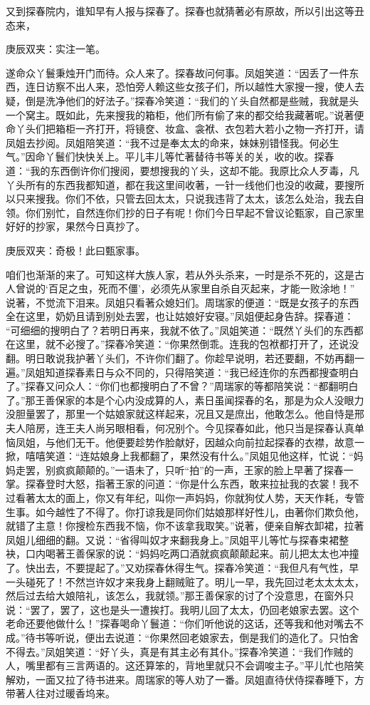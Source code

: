 \begin{parag}
    又到探春院内，谁知早有人报与探春了。探春也就猜著必有原故，所以引出这等丑态来，\begin{note}庚辰双夹：实注一笔。\end{note}遂命众丫鬟秉烛开门而待。众人来了。探春故问何事。凤姐笑道：“因丢了一件东西，连日访察不出人来，恐怕旁人赖这些女孩子们，所以越性大家搜一搜，使人去疑，倒是洗净他们的好法子。”探春冷笑道：“我们的丫头自然都是些贼，我就是头一个窝主。既如此，先来搜我的箱柜，他们所有偷了来的都交给我藏著呢。”说著便命丫头们把箱柜一齐打开，将镜奁、妆盒、衾袱、衣包若大若小之物一齐打开，请凤姐去抄阅。凤姐陪笑道：“我不过是奉太太的命来，妹妹别错怪我。何必生气。”因命丫鬟们快快关上。平儿丰儿等忙著替待书等关的关，收的收。探春道：“我的东西倒许你们搜阅，要想搜我的丫头，这却不能。我原比众人歹毒，凡丫头所有的东西我都知道，都在我这里间收著，一针一线他们也没的收藏，要搜所以只来搜我。你们不依，只管去回太太，只说我违背了太太，该怎么处治，我去自领。你们别忙，自然连你们抄的日子有呢！你们今日早起不曾议论甄家，自己家里好好的抄家，果然今日真抄了。\begin{note}庚辰双夹：奇极！此曰甄家事。\end{note}咱们也渐渐的来了。可知这样大族人家，若从外头杀来，一时是杀不死的，这是古人曾说的‘百足之虫，死而不僵’，必须先从家里自杀自灭起来，才能一败涂地！” 说著，不觉流下泪来。凤姐只看著众媳妇们。周瑞家的便道：“既是女孩子的东西全在这里，奶奶且请到别处去罢，也让姑娘好安寝。”凤姐便起身告辞。探春道： “可细细的搜明白了？若明日再来，我就不依了。”凤姐笑道：“既然丫头们的东西都在这里，就不必搜了。”探春冷笑道：“你果然倒乖。连我的包袱都打开了，还说没翻。明日敢说我护著丫头们，不许你们翻了。你趁早说明，若还要翻，不妨再翻一遍。”凤姐知道探春素日与众不同的，只得陪笑道：“我已经连你的东西都搜查明白了。”探春又问众人：“你们也都搜明白了不曾？”周瑞家的等都陪笑说：“都翻明白了。”那王善保家的本是个心内没成算的人，素日虽闻探春的名，那是为众人没眼力没胆量罢了，那里一个姑娘家就这样起来，况且又是庶出，他敢怎么。他自恃是邢夫人陪房，连王夫人尚另眼相看，何况别个。今见探春如此，他只当是探春认真单恼凤姐，与他们无干。他便要趁势作脸献好，因越众向前拉起探春的衣襟，故意一掀，嘻嘻笑道：“连姑娘身上我都翻了，果然没有什么。”凤姐见他这样，忙说：“妈妈走罢，别疯疯颠颠的。”一语未了，只听“拍”的一声，王家的脸上早著了探春一掌。探春登时大怒，指著王家的问道：“你是什么东西，敢来拉扯我的衣裳！我不过看著太太的面上，你又有年纪，叫你一声妈妈，你就狗仗人势，天天作耗，专管生事。如今越性了不得了。你打谅我是同你们姑娘那样好性儿，由著你们欺负他，就错了主意！你搜检东西我不恼，你不该拿我取笑。”说著，便亲自解衣卸裙，拉著凤姐儿细细的翻。又说：“省得叫奴才来翻我身上。”凤姐平儿等忙与探春束裙整袂，口内喝著王善保家的说：“妈妈吃两口酒就疯疯颠颠起来。前儿把太太也冲撞了。快出去，不要提起了。”又劝探春休得生气。探春冷笑道：“我但凡有气性，早一头碰死了！不然岂许奴才来我身上翻贼赃了。明儿一早，我先回过老太太太太，然后过去给大娘陪礼，该怎么，我就领。”那王善保家的讨了个没意思，在窗外只说：“罢了，罢了，这也是头一遭挨打。我明儿回了太太，仍回老娘家去罢。这个老命还要他做什么！”探春喝命丫鬟道：“你们听他说的这话，还等我和他对嘴去不成。”待书等听说，便出去说道：“你果然回老娘家去，倒是我们的造化了。只怕舍不得去。”凤姐笑道：“好丫头，真是有其主必有其仆。”探春冷笑道：“我们作贼的人，嘴里都有三言两语的。这还算笨的，背地里就只不会调唆主子。”平儿忙也陪笑解劝，一面又拉了待书进来。周瑞家的等人劝了一番。凤姐直待伏侍探春睡下，方带著人往对过暖香坞来。

\end{parag}
